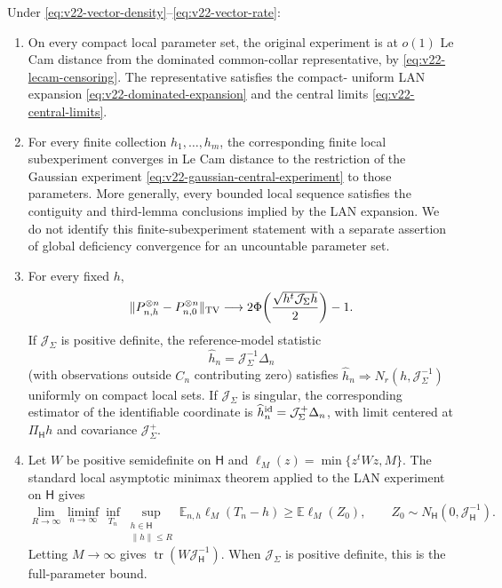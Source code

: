 \begin{theorem}
\label{thm:v22-vector-boundary-gaussian}
Under \eqref{eq:v22-vector-density}--\eqref{eq:v22-vector-rate}:

\begin{enumerate}
\item On every compact local parameter set, the original experiment is at
$o(1)$ Le Cam distance from the dominated common-collar representative, by
\eqref{eq:v22-lecam-censoring}.  The representative satisfies the compact-
uniform LAN expansion \eqref{eq:v22-dominated-expansion} and the central
limits \eqref{eq:v22-central-limits}.

\item For every finite collection $h_1,\ldots,h_m$, the corresponding finite
local subexperiment converges in Le Cam distance to the restriction of the
Gaussian experiment \eqref{eq:v22-gaussian-central-experiment} to those
parameters.  More generally, every bounded local sequence satisfies the
contiguity and third-lemma conclusions implied by the LAN expansion.  We do
not identify this finite-subexperiment statement with a separate assertion
of global deficiency convergence for an uncountable parameter set.

\item For every fixed $h$,
\begin{equation}\label{eq:v22-testing-profile}
 \|P_{n,h}^{\otimes n}-P_{n,0}^{\otimes n}\|_{\rm TV}
 \longrightarrow
 2\Phi\!\left(\frac{\sqrt{h^t\mathcal J_\Sigma h}}2\right)-1.
\end{equation}
If $\mathcal J_\Sigma$ is positive definite, the reference-model statistic
\begin{equation}\label{eq:v22-local-estimator}
                 \widehat h_n=\mathcal J_\Sigma^{-1}\Delta_n
\end{equation}
(with observations outside $C_n$ contributing zero) satisfies
$\widehat h_n\Rightarrow N_r(h,\mathcal J_\Sigma^{-1})$ uniformly on compact
local sets.  If $\mathcal J_\Sigma$ is singular, the corresponding estimator
of the identifiable coordinate is
$\widehat h_n^{\rm id}=\mathcal J_\Sigma^+\Delta_n$, with limit centered at
$\Pi_{\mathsf H}h$ and covariance $\mathcal J_\Sigma^+$.

\item Let $W$ be positive semidefinite on $\mathsf H$ and
$\ell_M(z)=\min\{z^tWz,M\}$.  The standard local asymptotic minimax theorem
applied to the LAN experiment on $\mathsf H$ gives
\begin{equation}\label{eq:v22-minimax-truncated}
 \lim_{R\to\infty}\liminf_{n\to\infty}
 \inf_{T_n}\sup_{\substack{h\in\mathsf H\\\|h\|\le R}}
 \mathbb E_{n,h}\ell_M(T_n-h)
 \ge
 \mathbb E\ell_M(Z_0),
 \qquad
 Z_0\sim N_{\mathsf H}(0,\mathcal J_{\mathsf H}^{-1}).
\end{equation}
Letting $M\to\infty$ gives
$\operatorname{tr}(W\mathcal J_{\mathsf H}^{-1})$.  When
$\mathcal J_\Sigma$ is positive definite, this is the full-parameter bound.
\end{enumerate}
\end{theorem}

